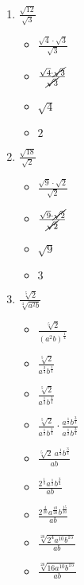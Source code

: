\documentclass{article}
\begin{document}
\begin{onehalfspace}
\begin{enumerate}[start=59]
        \item $\frac{\sqrt{12}}{\sqrt{3}}$
        \begin{itemize}
            \item $\frac{\sqrt{4} \cdot \sqrt{3}}{\sqrt{3}}$
            \item $\frac{\sqrt{4} \cdot \cancel{\sqrt{3}}}{\cancel{\sqrt{3}}}$
            \item $\sqrt{4}$
            \item $2$
        \end{itemize}

        \item $\frac{\sqrt{18}}{\sqrt{2}}$
        \begin{itemize}
            \item $\frac{\sqrt{9} \cdot \sqrt{2}}{\sqrt{2}}$
            \item $\frac{\sqrt{9} \cdot \cancel{\sqrt{2}}}{\cancel{\sqrt{2}}}$
            \item $\sqrt{9}$
            \item $3$
        \end{itemize}

        \item $\frac{\sqrt[5]{2}}{\sqrt[4]{a^{2}b}}$
        \begin{itemize}
            \item $\frac{\sqrt[5]{2}}{(a^{2}b)^{\frac{1}{4}}}$
            \item $\frac{\sqrt[5]{2}}{a^{\frac{2}{4}}b^{\frac{1}{4}}}$
            \item $\frac{\sqrt[5]{2}}{a^{\frac{1}{2}}b^{\frac{1}{4}}}$
            \item $\frac{\sqrt[5]{2}}{a^{\frac{1}{2}}b^{\frac{1}{4}}} \cdot \frac{a^{\frac{1}{2}}b^{\frac{3}{4}}}{a^{\frac{1}{2}}b^{\frac{3}{4}}}$
            \item $\frac{\sqrt[5]{2} \ a^{\frac{1}{2}} b^{\frac{3}{4}}}{ab}$
            \item $\frac{2^{\frac{1}{5}}a^{\frac{1}{2}} b^{\frac{3}{4}}}{ab}$
            \item $\frac{2^{\frac{4}{20}}a^{\frac{10}{20}} b^{\frac{15}{20}}}{ab}$
            \item $\frac{\sqrt[20]{2^{4} a^{10} b^{15}}}{ab}$
            \item $\frac{\sqrt[20]{16 a^{10} b^{15}}}{ab}$
        \end{itemize}


\end{enumerate}
\end{onehalfspace}
\end{document}
